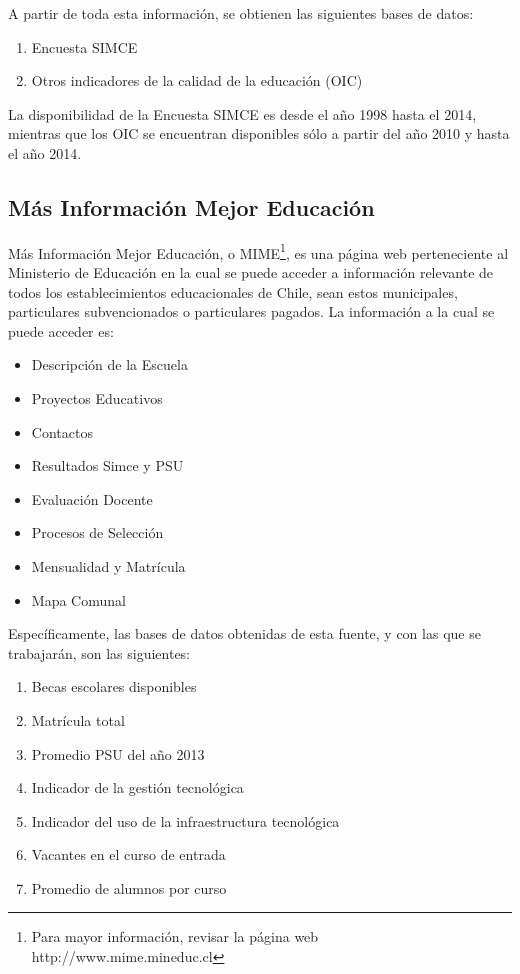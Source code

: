 A partir de toda esta información, se obtienen las siguientes bases de datos:
\begin{enumerate}
\item Encuesta SIMCE
\item Otros indicadores de la calidad de la educación (OIC)
\end{enumerate}

La disponibilidad de la Encuesta SIMCE es desde el año 1998 hasta el 2014, mientras que los OIC se encuentran disponibles sólo a partir del año 2010 y hasta el año 2014. 

\subsection{Más Información Mejor Educación}
Más Información Mejor Educación, o MIME\footnote{Para mayor información, revisar la página web http://www.mime.mineduc.cl}, es una página web perteneciente al Ministerio de Educación en la cual se puede acceder a información relevante de todos los establecimientos educacionales de Chile, sean estos municipales, particulares subvencionados o particulares pagados. 
La información a la cual se puede acceder es:
\begin{itemize}
\item Descripción de la Escuela
\item Proyectos Educativos
\item Contactos
\item Resultados Simce y PSU
\item Evaluación Docente
\item Procesos de Selección
\item Mensualidad y Matrícula
\item Mapa Comunal
\end{itemize}

Específicamente, las bases de datos obtenidas de esta fuente, y con las que se trabajarán, son las siguientes: 
\begin{enumerate}
\item Becas escolares disponibles
\item Matrícula total
\item Promedio PSU del año 2013
\item Indicador de la gestión tecnológica
\item Indicador del uso de la infraestructura tecnológica
\item Vacantes en el curso de entrada
\item Promedio de alumnos por curso
\end{enumerate}


